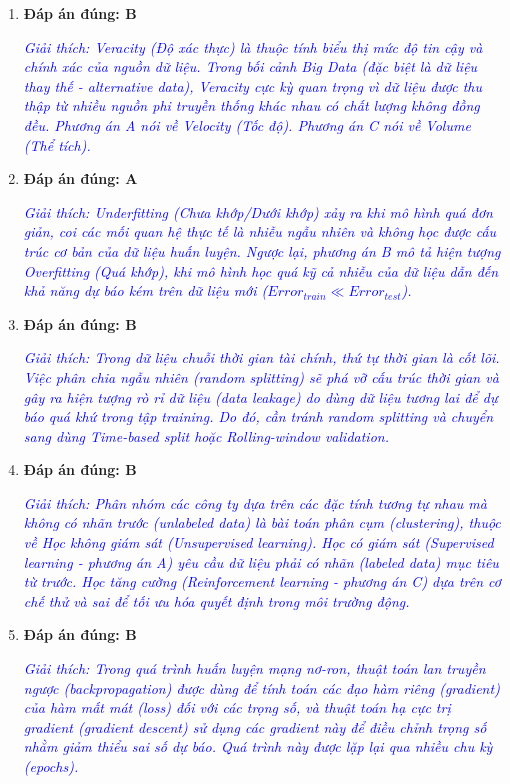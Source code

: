 \begin{enumerate}
	\item \textbf{Đáp án đúng: B}
	      
	      \textcolor{blue}{\textit{Giải thích: Veracity (Độ xác thực) là thuộc tính biểu thị mức độ tin cậy và chính xác của nguồn dữ liệu. Trong bối cảnh Big Data (đặc biệt là dữ liệu thay thế - alternative data), Veracity cực kỳ quan trọng vì dữ liệu được thu thập từ nhiều nguồn phi truyền thống khác nhau có chất lượng không đồng đều. Phương án A nói về Velocity (Tốc độ). Phương án C nói về Volume (Thể tích).}}
	      
	\item \textbf{Đáp án đúng: A}
	      
	      \textcolor{blue}{\textit{Giải thích: Underfitting (Chưa khớp/Dưới khớp) xảy ra khi mô hình quá đơn giản, coi các mối quan hệ thực tế là nhiễu ngẫu nhiên và không học được cấu trúc cơ bản của dữ liệu huấn luyện. Ngược lại, phương án B mô tả hiện tượng Overfitting (Quá khớp), khi mô hình học quá kỹ cả nhiễu của dữ liệu dẫn đến khả năng dự báo kém trên dữ liệu mới ($Error_{train} \ll Error_{test}$).}}
	      
	\item \textbf{Đáp án đúng: B}
	      
	      \textcolor{blue}{\textit{Giải thích: Trong dữ liệu chuỗi thời gian tài chính, thứ tự thời gian là cốt lõi. Việc phân chia ngẫu nhiên (random splitting) sẽ phá vỡ cấu trúc thời gian và gây ra hiện tượng rò rỉ dữ liệu (data leakage) do dùng dữ liệu tương lai để dự báo quá khứ trong tập training. Do đó, cần tránh random splitting và chuyển sang dùng Time-based split hoặc Rolling-window validation.}}
	      
	\item \textbf{Đáp án đúng: B}
	      
	      \textcolor{blue}{\textit{Giải thích: Phân nhóm các công ty dựa trên các đặc tính tương tự nhau mà không có nhãn trước (unlabeled data) là bài toán phân cụm (clustering), thuộc về Học không giám sát (Unsupervised learning). Học có giám sát (Supervised learning - phương án A) yêu cầu dữ liệu phải có nhãn (labeled data) mục tiêu từ trước. Học tăng cường (Reinforcement learning - phương án C) dựa trên cơ chế thử và sai để tối ưu hóa quyết định trong môi trường động.}}
	      
	\item \textbf{Đáp án đúng: B}
	      
	      \textcolor{blue}{\textit{Giải thích: Trong quá trình huấn luyện mạng nơ-ron, thuật toán lan truyền ngược (backpropagation) được dùng để tính toán các đạo hàm riêng (gradient) của hàm mất mát (loss) đối với các trọng số, và thuật toán hạ cực trị gradient (gradient descent) sử dụng các gradient này để điều chỉnh trọng số nhằm giảm thiểu sai số dự báo. Quá trình này được lặp lại qua nhiều chu kỳ (epochs).}}
	      

\end{enumerate}
